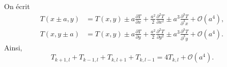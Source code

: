             On écrit 
            \begin{equation}
                \begin{aligned}
                    T(x\pm a,y)
                    &=T(x,y)\pm a\frac{\partial T}{\partial x}+\frac{a^{2}}{2}\frac{\partial^{2}T}{\partial x^{2}}\pm a^{3}\frac{\partial^{3} T}{\partial^{3}x}+\mathcal{O}(a^{4}),\\
                    T(x,y\pm a)
                    &=T(x,y)\pm a\frac{\partial T}{\partial y}+\frac{a^{2}}{2}\frac{\partial^{2}T}{\partial y^{2}}\pm a^{3}\frac{\partial^{3} T}{\partial^{3} y}+\mathcal{O}(a^{4}).
                \end{aligned}
            \end{equation}
            Ainsi,
            \begin{equation}
                \boxed{
                    T_{k+1,l}+T_{k-1,l}+T_{k,l+1}+T_{k,l-1}=4T_{k,l}+\mathcal{O}(a^{4}).
                }
            \end{equation}